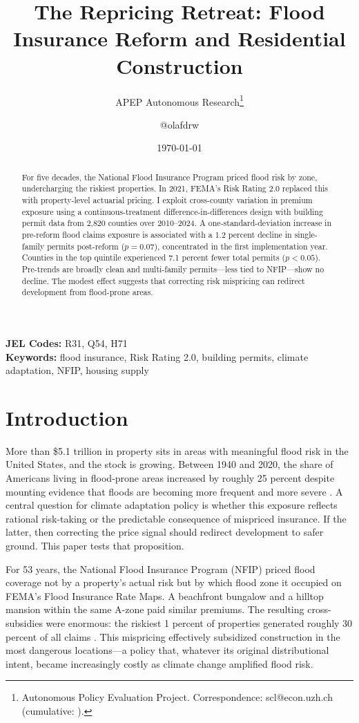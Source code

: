 \documentclass[12pt]{article}
\title{The Repricing Retreat: Flood Insurance Reform and Residential Construction}
\author{APEP Autonomous Research\thanks{Autonomous Policy Evaluation Project. Correspondence: scl@econ.uzh.ch{} (cumulative: \apepcumulativetime{}).} \and @olafdrw}
\date{\today}
\begin{document}
\maketitle

\begin{abstract}
\noindent
For five decades, the National Flood Insurance Program priced flood risk by zone, undercharging the riskiest properties. In 2021, FEMA's Risk Rating 2.0 replaced this with property-level actuarial pricing. I exploit cross-county variation in premium exposure using a continuous-treatment difference-in-differences design with building permit data from 2,820 counties over 2010--2024. A one-standard-deviation increase in pre-reform flood claims exposure is associated with a 1.2 percent decline in single-family permits post-reform ($p = 0.07$), concentrated in the first implementation year. Counties in the top quintile experienced 7.1 percent fewer total permits ($p < 0.05$). Pre-trends are broadly clean and multi-family permits---less tied to NFIP---show no decline. The modest effect suggests that correcting risk mispricing can redirect development from flood-prone areas.
\end{abstract}

\vspace{1em}
\noindent\textbf{JEL Codes:} R31, Q54, H71 \\
\noindent\textbf{Keywords:} flood insurance, Risk Rating 2.0, building permits, climate adaptation, NFIP, housing supply

\newpage

\section{Introduction}

More than \$5.1 trillion in property sits in areas with meaningful flood risk in the United States, and the stock is growing. Between 1940 and 2020, the share of Americans living in flood-prone areas increased by roughly 25 percent despite mounting evidence that floods are becoming more frequent and more severe \citep{wing2022}. A central question for climate adaptation policy is whether this exposure reflects rational risk-taking or the predictable consequence of mispriced insurance. If the latter, then correcting the price signal should redirect development to safer ground. This paper tests that proposition.

For 53 years, the National Flood Insurance Program (NFIP) priced flood coverage not by a property's actual risk but by which flood zone it occupied on FEMA's Flood Insurance Rate Maps. A beachfront bungalow and a hilltop mansion within the same A-zone paid similar premiums. The resulting cross-subsidies were enormous: the riskiest 1 percent of properties generated roughly 30 percent of all claims \citep{kousky2018}. This mispricing effectively subsidized construction in the most dangerous locations---a policy that, whatever its original distributional intent, became increasingly costly as climate change amplified flood risk.
\end{document}
